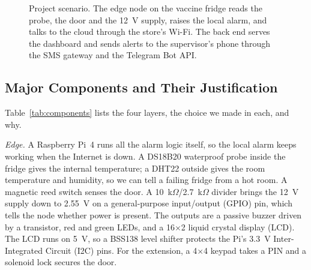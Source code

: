 \documentclass[conference,12pt]{IEEEtran}
\begin{document}
\begin{figure}[!t]
{}
\caption{Project scenario. The edge node on the vaccine fridge reads the probe, the door and the
12~V supply, raises the local alarm, and talks to the cloud through the store's Wi-Fi. The back end
serves the dashboard and sends alerts to the supervisor's phone through the SMS gateway and the Telegram Bot API.}
\label{fig:scenario}
\end{figure}

\subsection{Major Components and Their Justification}

Table~\ref{tab:components} lists the four layers, the choice we made in each, and why.

\emph{Edge.} A Raspberry Pi~4 runs all the alarm logic itself, so the local alarm keeps working
when the Internet is down. A DS18B20 waterproof probe inside the fridge gives the internal
temperature; a DHT22 outside gives the room temperature and humidity, so we can tell a failing
fridge from a hot room. A magnetic reed switch senses the door. A 10~k$\Omega$/2.7~k$\Omega$
divider brings the 12~V supply down to 2.55~V on a general-purpose input/output (GPIO) pin, which
tells the node whether power is present. The outputs are a passive buzzer driven by a transistor,
red and green LEDs, and a 16$\times$2 liquid crystal display (LCD). The LCD runs on 5~V, so a
BSS138 level shifter protects the Pi's 3.3~V Inter-Integrated Circuit (I2C) pins. For the
extension, a 4$\times$4 keypad takes a PIN and a solenoid lock secures the door.
\end{document}
